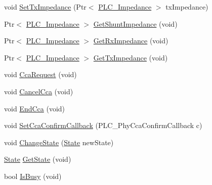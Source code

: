 \begin{DoxyCompactItemize}
void \hyperlink{classns3_1_1PLC__HalfDuplexOfdmPhy_a8633a9bbaafcccf370900b1301d1c963}{\-Set\-Tx\-Impedance} (\-Ptr$<$ \hyperlink{classns3_1_1PLC__ValueBase}{\-P\-L\-C\-\_\-\-Impedance} $>$ tx\-Impedance)
\item 
\-Ptr$<$ \hyperlink{classns3_1_1PLC__ValueBase}{\-P\-L\-C\-\_\-\-Impedance} $>$ \hyperlink{classns3_1_1PLC__HalfDuplexOfdmPhy_a22702ed1d5c608d1ba3a080df7cfedd5}{\-Get\-Shunt\-Impedance} (void)
\item 
\-Ptr$<$ \hyperlink{classns3_1_1PLC__ValueBase}{\-P\-L\-C\-\_\-\-Impedance} $>$ \hyperlink{classns3_1_1PLC__HalfDuplexOfdmPhy_a389c21538679bec18de4c624dd28c61f}{\-Get\-Rx\-Impedance} (void)
\item 
\-Ptr$<$ \hyperlink{classns3_1_1PLC__ValueBase}{\-P\-L\-C\-\_\-\-Impedance} $>$ \hyperlink{classns3_1_1PLC__HalfDuplexOfdmPhy_ab5b12c099c8f65bef93a85e2c48bd4c6}{\-Get\-Tx\-Impedance} (void)
\item 
void \hyperlink{classns3_1_1PLC__HalfDuplexOfdmPhy_aedcd8f1a9400e8a671736fb62fafd340}{\-Cca\-Request} (void)
\item 
void \hyperlink{classns3_1_1PLC__HalfDuplexOfdmPhy_a16299517e55127bc575d52d6f809ed7b}{\-Cancel\-Cca} (void)
\item 
void \hyperlink{classns3_1_1PLC__HalfDuplexOfdmPhy_af33d069bbe8515210d3d4417dd5bccbd}{\-End\-Cca} (void)
\item 
void \hyperlink{classns3_1_1PLC__HalfDuplexOfdmPhy_a164bdc70d4527dd9790d5cb75bc877ff}{\-Set\-Cca\-Confirm\-Callback} (\-P\-L\-C\-\_\-\-Phy\-Cca\-Confirm\-Callback c)
\item 
void \hyperlink{classns3_1_1PLC__HalfDuplexOfdmPhy_a180d9f91b00a180c05a806b5b65d7e35}{\-Change\-State} (\hyperlink{classns3_1_1PLC__HalfDuplexOfdmPhy_ae91e168f9a51bf5344e7e03d9ae13b60}{\-State} new\-State)
\item 
\hyperlink{classns3_1_1PLC__HalfDuplexOfdmPhy_ae91e168f9a51bf5344e7e03d9ae13b60}{\-State} \hyperlink{classns3_1_1PLC__HalfDuplexOfdmPhy_a9ee7d4f5414925e91038ea157eabcf4b}{\-Get\-State} (void)
\item 
bool \hyperlink{classns3_1_1PLC__HalfDuplexOfdmPhy_a39ba28f6194b993dbc5b688a419a820d}{\-Is\-Busy} (void)
\end{DoxyCompactItemize}
